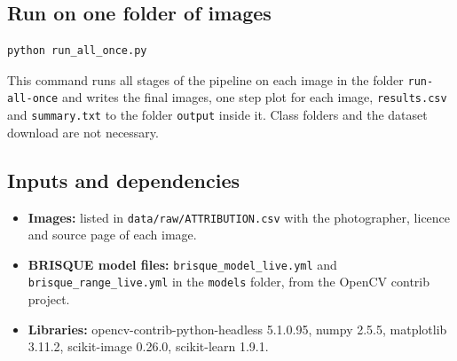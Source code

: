 \documentclass[12pt,a4paper]{article}
\begin{document}
\subsection{Run on one folder of images}
\begin{lstlisting}[language=bash,numbers=none]
python run_all_once.py
\end{lstlisting}
This command runs all stages of the pipeline on each image in the folder \texttt{run-all-once} and writes the final images, one step plot for each image, \texttt{results.csv} and \texttt{summary.txt} to the folder \texttt{output} inside it. Class folders and the dataset download are not necessary.

\subsection{Inputs and dependencies}
\begin{itemize}[nosep]
\item \textbf{Images:} listed in \texttt{data/raw/ATTRIBUTION.csv} with the photographer, licence and source page of each image.
\item \textbf{BRISQUE model files:} \texttt{brisque\_model\_live.yml} and \texttt{brisque\_range\_live.yml} in the \texttt{models} folder, from the OpenCV contrib project.
\item \textbf{Libraries:} opencv-contrib-python-headless 5.1.0.95, numpy 2.5.5, matplotlib 3.11.2, scikit-image 0.26.0, scikit-learn 1.9.1.
\end{itemize}
\end{document}

